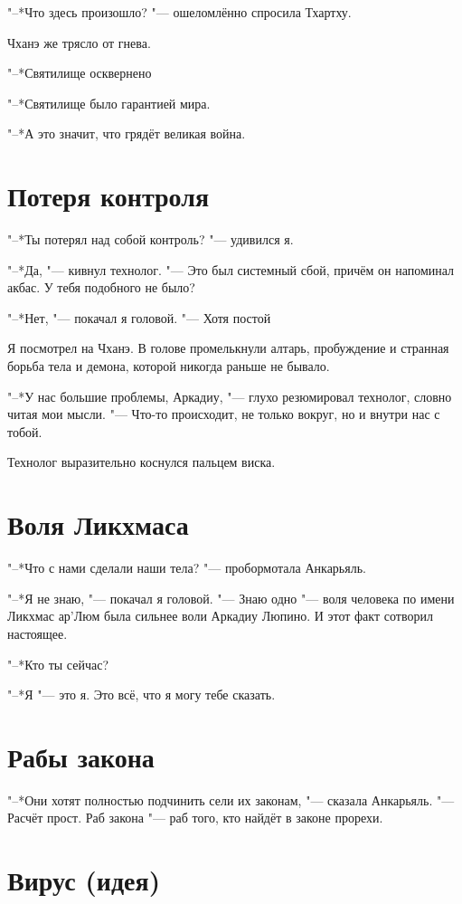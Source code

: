 "--*Что здесь произошло? "--- ошеломлённо спросила Тхартху.

Чханэ же трясло от гнева.

"--*Святилище осквернено\ldotst

\spacing

"--*Святилище было гарантией мира.

"--*А это значит, что грядёт великая война.

\section{Потеря контроля}

"--*Ты потерял над собой контроль? "--- удивился я.

"--*Да, "--- кивнул технолог.
"--- Это был системный сбой, причём он напоминал акбас.
У тебя подобного не было?

"--*Нет, "--- покачал я головой.
"--- Хотя постой\ldotst

Я посмотрел на Чханэ.
В голове промелькнули алтарь, пробуждение и странная борьба тела и демона, которой никогда раньше не бывало.

"--*У нас большие проблемы, Аркадиу, "--- глухо резюмировал технолог, словно читая мои мысли.
"--- Что-то происходит, не только вокруг, но и внутри нас с тобой.

Технолог выразительно коснулся пальцем виска.

\section{Воля Ликхмаса}

"--*Что с нами сделали наши тела? "--- пробормотала Анкарьяль.

"--*Я не знаю, "--- покачал я головой.
"--- Знаю одно "--- воля человека по имени Ликхмас ар'Люм была сильнее воли Аркадиу Люпино.
И этот факт сотворил настоящее.

"--*Кто ты сейчас?

"--*Я "--- это я.
Это всё, что я могу тебе сказать.

\section{Рабы закона}

"--*Они хотят полностью подчинить сели их законам, "--- сказала Анкарьяль.
"--- Расчёт прост.
Раб закона "--- раб того, кто найдёт в законе прорехи.

\section{Вирус (идея)}

